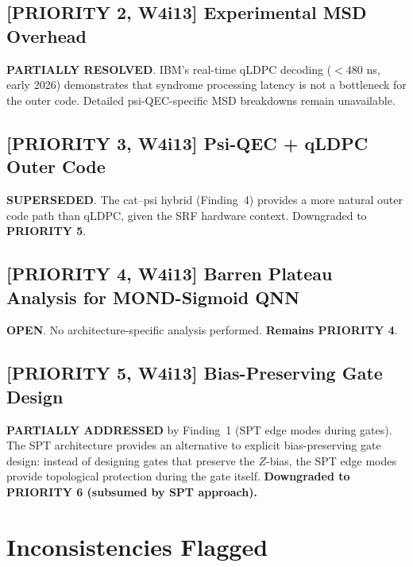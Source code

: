 \documentclass[11pt]{article}
\theoremstyle{definition}
\theoremstyle{remark}
\begin{document}
\subsection{[PRIORITY 2, W4i13] Experimental MSD Overhead}

\textbf{PARTIALLY RESOLVED}.  IBM's real-time qLDPC decoding ($< 480$ ns,
early 2026) demonstrates that syndrome processing latency is not a
bottleneck for the outer code.  Detailed psi-QEC-specific MSD breakdowns
remain unavailable.

\subsection{[PRIORITY 3, W4i13] Psi-QEC + qLDPC Outer Code}

\textbf{SUPERSEDED}.  The cat--psi hybrid (Finding~4) provides a more
natural outer code path than qLDPC, given the SRF hardware context.
Downgraded to \textbf{PRIORITY 5}.

\subsection{[PRIORITY 4, W4i13] Barren Plateau Analysis for MOND-Sigmoid QNN}

\textbf{OPEN}.  No architecture-specific analysis performed.
\textbf{Remains PRIORITY 4}.

\subsection{[PRIORITY 5, W4i13] Bias-Preserving Gate Design}

\textbf{PARTIALLY ADDRESSED} by Finding~1 (SPT edge modes during gates).
The SPT architecture provides an alternative to explicit bias-preserving
gate design: instead of designing gates that preserve the $Z$-bias, the
SPT edge modes provide topological protection during the gate itself.
\textbf{Downgraded to PRIORITY 6 (subsumed by SPT approach).}

\section{Inconsistencies Flagged}
\label{sec:inconsistencies}
\end{document}
